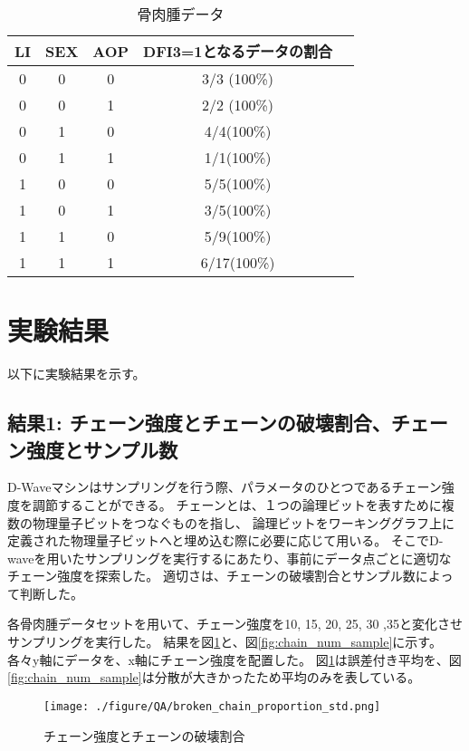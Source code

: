 \documentclass[12pt, dvipdfmx]{jmaster}
\theoremstyle{definition}
\begin{document}
\begin{table}[hbtp]
	\caption{骨肉腫データ}
	\label{tb:ost}
	\centering
	\begin{tabular}{ccccc}
		\hline
		LI & SEX & AOP & DFI3=1となるデータの割合\\
		\hline\hline
		0 & 0 & 0 & 3/3 (100\%)\\
		0 & 0 & 1 & 2/2 (100\%)\\
		0 & 1 & 0 & 4/4(100\%)\\
		0 & 1 & 1 & 1/1(100\%)\\
		1 & 0 & 0 & 5/5(100\%)\\
		1 & 0 & 1 & 3/5(100\%)\\
		1 & 1 & 0 & 5/9(100\%)\\
		1 & 1 & 1 & 6/17(100\%)\\
		\hline
	\end{tabular}
\end{table}


\section{実験結果}
以下に実験結果を示す。

\subsection{結果1: チェーン強度とチェーンの破壊割合、チェーン強度とサンプル数}
\label{sec:chain}
D-Waveマシンはサンプリングを行う際、パラメータのひとつであるチェーン強度を調節することができる。
チェーンとは、１つの論理ビットを表すために複数の物理量子ビットをつなぐものを指し、
論理ビットをワーキンググラフ上に定義された物理量子ビットへと埋め込む際に必要に応じて用いる\cite{d-wave}。
そこでD-waveを用いたサンプリングを実行するにあたり、事前にデータ点ごとに適切なチェーン強度を探索した。
適切さは、チェーンの破壊割合とサンプル数によって判断した。

各骨肉腫データセットを用いて、チェーン強度を10, 15, 20, 25, 30 ,35と変化させサンプリングを実行した。
結果を図\ref{fig:broken}と、図\ref{fig:chain_num_sample}に示す。
各々y軸にデータを、x軸にチェーン強度を配置した。
図\ref{fig:broken}は誤差付き平均を、図\ref{fig:chain_num_sample}は分散が大きかったため平均のみを表している。

\begin{figure}[H]
	\begin{center}
		\texttt{[image: ./figure/QA/broken\_chain\_proportion\_std.png]}
	\end{center}
	\caption{チェーン強度とチェーンの破壊割合}
	\label{fig:broken}
\end{figure}
\end{document}
